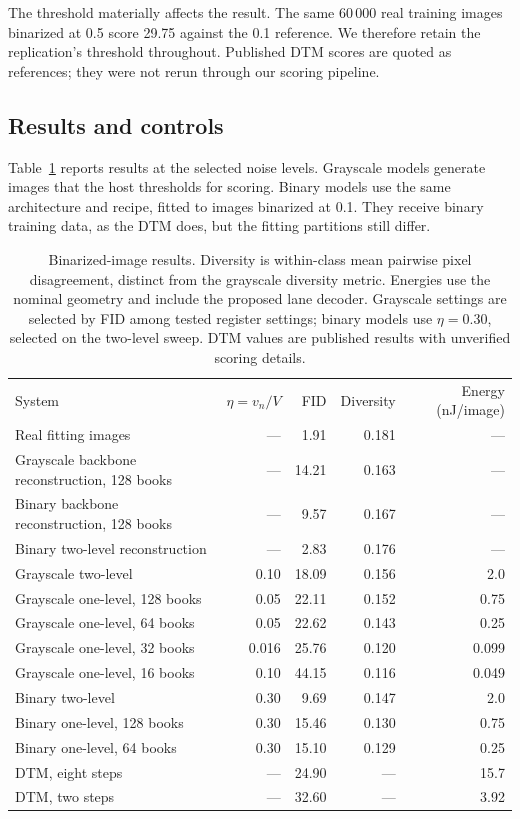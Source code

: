\documentclass[reprint,amsmath,amssymb,aps,pra,floatfix,nofootinbib]{revtex4-2}
\newcommand{\noise}{\eta}
\begin{document}
The threshold materially affects the result. The same 60\,000 real training images binarized at 0.5 score 29.75 against the 0.1 reference. We therefore retain the replication's threshold throughout. Published DTM scores are quoted as references; they were not rerun through our scoring pipeline.

\subsection{Results and controls}
Table~\ref{tab:fid} reports results at the selected noise levels. Grayscale models generate images that the host thresholds for scoring. Binary models use the same architecture and recipe, fitted to images binarized at 0.1. They receive binary training data, as the DTM does, but the fitting partitions still differ.

\begin{table}[tp]
\caption{Binarized-image results. Diversity is within-class mean pairwise pixel disagreement, distinct from the grayscale diversity metric. Energies use the nominal geometry and include the proposed lane decoder. Grayscale settings are selected by FID among tested register settings; binary models use $\noise=0.30$, selected on the two-level sweep. DTM values are published results with unverified scoring details.}
\label{tab:fid}
\begin{ruledtabular}
\begin{tabular}{lrrrr}
System & $\noise=v_n/V$ & FID & Diversity & Energy (nJ/image)\\
\colrule
Real fitting images & --- & 1.91 & 0.181 & ---\\
Grayscale backbone reconstruction, 128 books & --- & 14.21 & 0.163 & ---\\
Binary backbone reconstruction, 128 books & --- & 9.57 & 0.167 & ---\\
Binary two-level reconstruction & --- & 2.83 & 0.176 & ---\\
\colrule
Grayscale two-level & 0.10 & 18.09 & 0.156 & 2.0\\
Grayscale one-level, 128 books & 0.05 & 22.11 & 0.152 & 0.75\\
Grayscale one-level, 64 books & 0.05 & 22.62 & 0.143 & 0.25\\
Grayscale one-level, 32 books & 0.016 & 25.76 & 0.120 & 0.099\\
Grayscale one-level, 16 books & 0.10 & 44.15 & 0.116 & 0.049\\
Binary two-level & 0.30 & 9.69 & 0.147 & 2.0\\
Binary one-level, 128 books & 0.30 & 15.46 & 0.130 & 0.75\\
Binary one-level, 64 books & 0.30 & 15.10 & 0.129 & 0.25\\
\colrule
DTM, eight steps \cite{jelincic2025dtm} & --- & 24.90 & --- & 15.7\\
DTM, two steps \cite{jelincic2025dtm} & --- & 32.60 & --- & 3.92\\
\end{tabular}
\end{ruledtabular}
\end{table}
\end{document}
